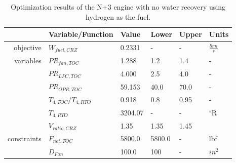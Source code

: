 \documentclass[conf]{new-aiaa}
\begin{document}
\begin{table}[h]
    \centering
    \caption{Optimization results of the N+3 engine with no water recovery using hydrogen as the fuel.
    }
    \small
    \renewcommand{\arraystretch}{1.2}
    \begin{tabular}{r l l l l l}
                    & Variable/Function     & Value   & Lower  & Upper & Units           \\
        \toprule
        objective   & $W_{fuel,CRZ}$        & 0.2331  & -      & -     & $\frac{lbm}{s}$ \\
        \hline
        variables   & $PR_{fan,TOC}$        & 1.288   & 1.2    & 1.4   & -               \\
                    & $PR_{LPC,TOC}$        & 4.000   & 2.5    & 4.0   & -               \\
                    & $PR_{OPR,TOC}$        & 59.153  & 40.0   & 70.0  & -               \\
                    & $T_{4,TOC}/T_{4,RTO}$ & 0.918   & 0.8    & 0.95  & -               \\
                    & $T_{4,RTO}$           & 3204.07 & -      & -     & $^\circ$R       \\
                    & $V_{ratio,CRZ}$       & 1.35    & 1.35   & 1.45  &                 \\
        \hline
        constraints & $F_{net,TOC}$         & 5800.0  & 5800.0 & -     & lbf             \\
                    & $D_{Fan}$             & 100.0   & 100    & -     & $in^2$          \\
        \bottomrule
    \end{tabular}
    \label{tab:res_thermo_opt_H2}
\end{table}
\end{document}

